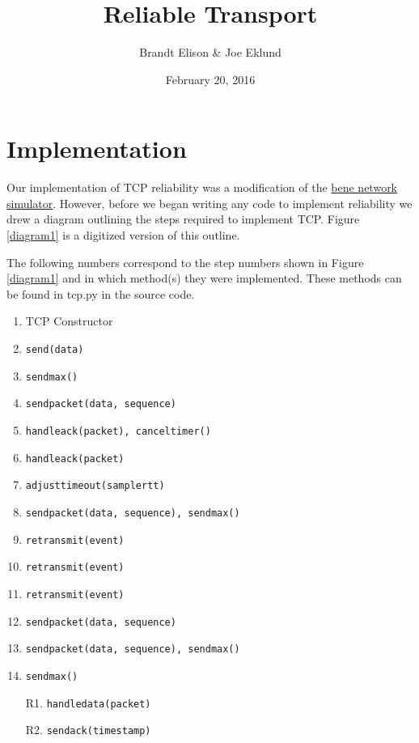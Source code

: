 \documentclass[11pt]{article}
\begin{document}
\lstset{
  language=Python,
  basicstyle=\small,          %
  keywordstyle=\bfseries,
  identifierstyle=,           %
  commentstyle=,              %
  stringstyle=\ttfamily,      %
  showstringspaces=false,     %
  numbers=left,
  numberstyle=\tiny,
  numbersep=5pt,
  frame=tb,
}

\title{Reliable Transport}

\author{Brandt Elison & Joe Eklund}

\date{February 20, 2016}

\maketitle

\section{Implementation}

Our implementation of TCP reliability was a modification of the \href{https://github.com/zappala/bene/}{bene network simulator}. However, before we began writing any code to implement reliability we drew a diagram outlining the steps required to implement TCP. Figure \ref{diagram1} is a digitized version of this outline.

The following numbers correspond to the step numbers shown in Figure \ref{diagram1} and in which method(s) they were implemented. These methods can be found in tcp.py in the source code.

\begin{enumerate}
  \item TCP Constructor
  \item \texttt{send(data)}
  \item \texttt{send\textunderscore max()}
  \item \texttt{send\textunderscore packet(data, sequence)}
  \item \texttt{handle\textunderscore ack(packet), cancel\textunderscore timer()}
  \item \texttt{handle\textunderscore ack(packet)}
  \item \texttt{adjust\textunderscore timeout(sample\textunderscore rtt)}
  \item \texttt{send\textunderscore packet(data, sequence), send\textunderscore max()}
  \item \texttt{retransmit(event)}
  \item \texttt{retransmit(event)}
  \item \texttt{retransmit(event)}
  \item \texttt{send\textunderscore packet(data, sequence)}
  \item \texttt{send\textunderscore packet(data, sequence), send\textunderscore max()}
  \item \texttt{send\textunderscore max()}
  \item[R1.] \texttt{handle\textunderscore data(packet)}
  \item[R2.] \texttt{send\textunderscore ack(time\textunderscore stamp)}
\end{enumerate}
\end{document}
